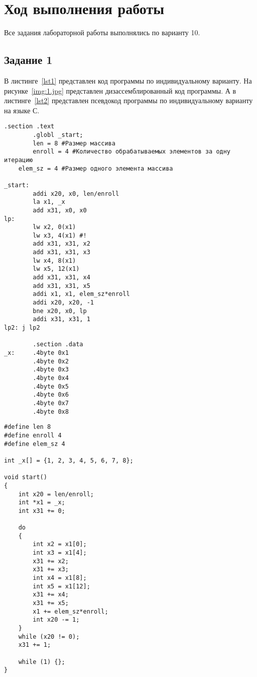 \section{Ход выполнения работы}

Все задания лабораторной работы выполнялись по варианту 10.

\subsection{Задание 1}

В листинге~\ref{lst1} представлен код программы по индивидуальному варианту. На рисунке~\ref{img:1.jpg} представлен дизассемблированный код программы. А в листинге~\ref{lst2} представлен псевдокод программы по индивидуальному варианту на языке С.

\begin{lstlisting}[caption={Код программы по индивидуальному варианту}, label=lst1, style=Go]
.section .text
        .globl _start;
        len = 8 #Размер массива
        enroll = 4 #Количество обрабатываемых элементов за одну итерацию
	elem_sz = 4 #Размер одного элемента массива

_start:
        addi x20, x0, len/enroll
        la x1, _x
		add x31, x0, x0
lp:
        lw x2, 0(x1)
        lw x3, 4(x1) #!
        add x31, x31, x2
        add x31, x31, x3
        lw x4, 8(x1)
        lw x5, 12(x1)
        add x31, x31, x4
        add x31, x31, x5
        addi x1, x1, elem_sz*enroll
        addi x20, x20, -1
        bne x20, x0, lp
        addi x31, x31, 1
lp2: j lp2

        .section .data
_x:     .4byte 0x1
        .4byte 0x2
        .4byte 0x3
        .4byte 0x4
        .4byte 0x5
        .4byte 0x6
        .4byte 0x7
        .4byte 0x8
\end{lstlisting}


\begin{lstlisting}[caption={Псевдокод на языке Си}, label=lst2, style=Go]
#define len 8
#define enroll 4
#define elem_sz 4

int _x[] = {1, 2, 3, 4, 5, 6, 7, 8};

void start()
{
	int x20 = len/enroll;
	int *x1 = _x;
	int x31 += 0;
	
	do
	{
		int x2 = x1[0];
		int x3 = x1[4];
		x31 += x2;
		x31 += x3;
		int x4 = x1[8];
		int x5 = x1[12];
		x31 += x4;
		x31 += x5;
		x1 += elem_sz*enroll;
		int x20 -= 1;
	}
	while (x20 != 0);
	x31 += 1;
	
	while (1) {};
}
\end{lstlisting}


